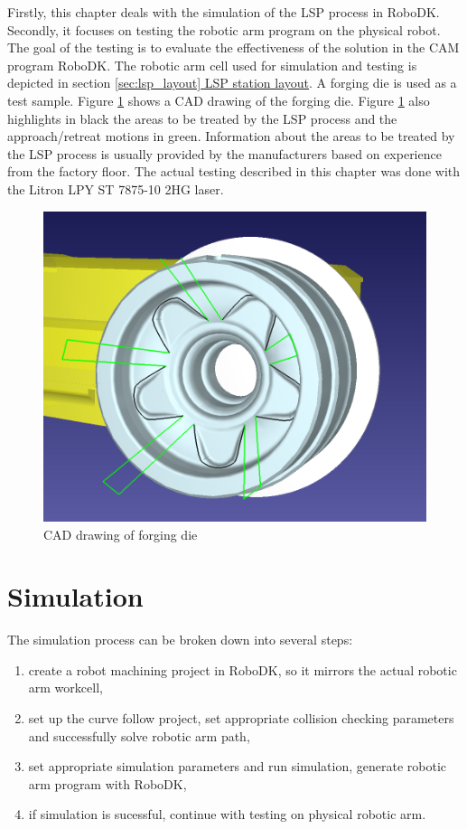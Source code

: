 \label{chap:testing}

Firstly, this chapter deals with the simulation of the LSP process in RoboDK. Secondly, it focuses on testing the robotic arm program on the physical robot. The goal of the testing is to evaluate the effectiveness of the solution in the CAM program RoboDK. The robotic arm cell used for simulation and testing is depicted in section \hyperref[sec:lsp_layout]{\ref{sec:lsp_layout} LSP station layout}. A forging die is used as a test sample. Figure \ref{fig:cad} shows a CAD drawing of the forging die. Figure \ref{fig:cad} also highlights in black the areas to be treated by the LSP process and the approach/retreat motions in green. Information about the areas to be treated by the LSP process is usually provided by the manufacturers based on experience from the factory floor. The actual testing described in this chapter was done with the Litron LPY ST 7875-10 2HG laser. 

\begin{figure}[h]
    \centering
    \includegraphics[width=0.8\linewidth]{img/cad.PNG}
    \caption{CAD drawing of forging die}
    \label{fig:cad}
\end{figure}

\section{Simulation}

The simulation process can be broken down into several steps:

\begin{enumerate}

\item create a robot machining project in RoboDK, so it mirrors the actual robotic arm workcell, 

\item set up the curve follow project, set appropriate collision checking parameters and successfully solve robotic arm path,

\item set appropriate simulation parameters and run simulation,
generate robotic arm program with RoboDK,

\item if simulation is sucessful, continue with testing on physical robotic arm.

\end{enumerate}

